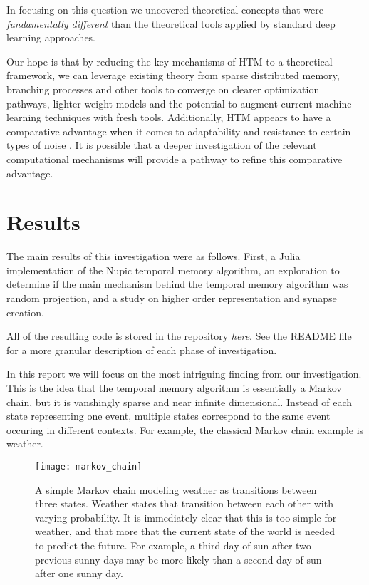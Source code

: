 \documentclass{article}
\begin{document}
In focusing on this question we uncovered theoretical concepts that were \textit{fundamentally different} than the theoretical tools applied by standard deep learning approaches.

Our hope is that by reducing the key mechanisms of HTM to a theoretical framework, we can leverage existing theory from sparse distributed memory, branching processes and other tools to converge on clearer optimization pathways, lighter weight models and the potential to augment current machine learning techniques with fresh tools. Additionally,  HTM appears to have a comparative advantage when it comes to adaptability and resistance to certain types of noise \cite{Cui2016b, Cui2017, Cui2016}. It is possible that a deeper investigation of the relevant computational mechanisms will provide a pathway to refine this comparative advantage.

\section*{Results}

The main results of this investigation were as follows. First, a Julia implementation of the Nupic temporal memory algorithm, an exploration to determine if the main mechanism behind the temporal memory algorithm was random projection, and a study on higher order representation and synapse creation.

All of the resulting code is stored in the repository \href{https://github.com/djpasseyjr/TemporalMemoryResearch}{\textit{here}}. See the README file for a more granular description of each phase of investigation.

In this report we will focus on the most intriguing finding from our investigation. This is the idea that the temporal memory algorithm is essentially a Markov chain, but it is vanshingly  sparse and near infinite dimensional. Instead of each state representing one event, multiple states correspond to the same event occuring in different contexts. For example, the classical Markov chain example is weather.

\begin{figure}[h]
\centering
\texttt{[image: markov\_chain]}
\caption{A simple Markov chain modeling weather as transitions between three states. Weather states that transition between each other with varying probability. It is immediately clear that this is too simple for weather, and that more that the current state of the world is needed to predict the future. For example, a third day of sun after two previous sunny days may be more likely than a second day of sun after one sunny day.}
\end{figure}
\end{document}
